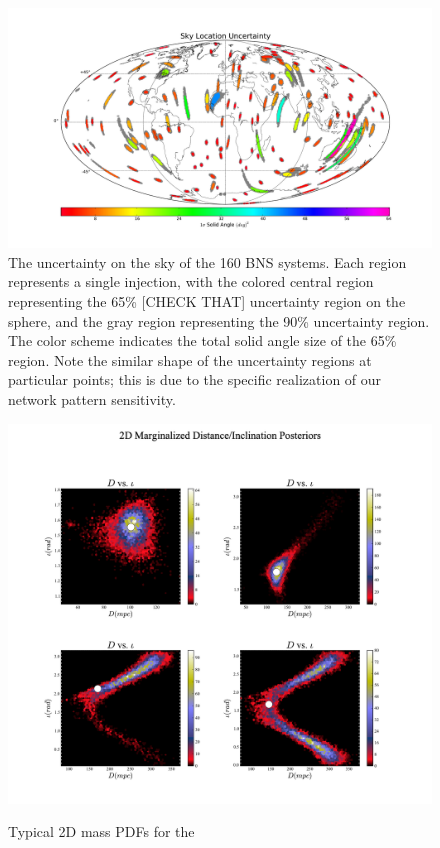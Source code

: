 \documentclass{emulateapj}
\newcommand{\carl}[1]{{\color{red}  #1}}
\begin{document}
\begin{figure}[tp!]
  \centering
 \includegraphics[angle=0,scale=0.49, trim=5cm 0cm 3cm 0cm]{skyLoc.pdf}
 \caption{The uncertainty on the sky of the 160 BNS systems.  Each region represents a single injection, with the colored central region representing the 65\% \carl{[CHECK THAT]} uncertainty region on the sphere, and the gray region representing the 90\% uncertainty region.  The color scheme indicates the total solid angle size of the 65\% region.  Note the similar shape of the uncertainty regions at particular points; this is due to the specific realization of our network pattern sensitivity.}
 \label{2525SkyLoc}
\end{figure}

   
\begin{figure}[h!]
  \centering
 \includegraphics[trim=2cm 0cm 2cm 0cm, clip=true,scale=0.575]{distIota2D.pdf}
 \label{masses}
 \caption{Typical 2D mass PDFs for the }
\end{figure}
\end{document}
